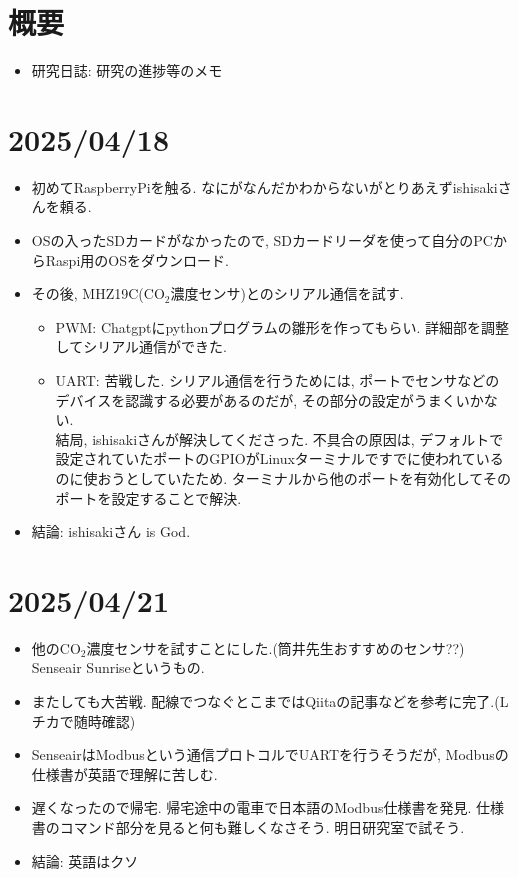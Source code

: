 \documentclass[11pt,a4paper,uplatex]{jsarticle}
\begin{document}
\section{概要}
\begin{itemize}
    \item 研究日誌: 研究の進捗等のメモ
\end{itemize}

\section{2025/04/18}
\begin{itemize}
    \item 初めてRaspberryPiを触る. なにがなんだかわからないがとりあえずishisakiさんを頼る.

    \item OSの入ったSDカードがなかったので, SDカードリーダを使って自分のPCからRaspi用のOSをダウンロード.
    \item その後, MHZ19C(CO$_2$濃度センサ)とのシリアル通信を試す. \url{}
    \begin{itemize}
        \item PWM: Chatgptにpythonプログラムの雛形を作ってもらい. 詳細部を調整してシリアル通信ができた.
        \item UART: 苦戦した. シリアル通信を行うためには, ポートでセンサなどのデバイスを認識する必要があるのだが, その部分の設定がうまくいかない. \\
        結局, ishisakiさんが解決してくださった. 不具合の原因は, デフォルトで設定されていたポートのGPIOがLinuxターミナルですでに使われているのに使おうとしていたため. 
        ターミナルから他のポートを有効化してそのポートを設定することで解決.
    \end{itemize}
    \item 結論: ishisakiさん is God.
\end{itemize}


\section{2025/04/21}
\begin{itemize}
    \item 他のCO$_2$濃度センサを試すことにした.(筒井先生おすすめのセンサ??) Senseair Sunriseというもの. \url{}
    \item またしても大苦戦. 配線でつなぐとこまではQiitaの記事などを参考に完了.(Lチカで随時確認)
    \item SenseairはModbusという通信プロトコルでUARTを行うそうだが, Modbusの仕様書が英語で理解に苦しむ.
    \item 遅くなったので帰宅. 帰宅途中の電車で日本語のModbus仕様書を発見. 仕様書のコマンド部分を見ると何も難しくなさそう. 明日研究室で試そう.
    \item 結論: 英語はクソ
\end{itemize}
\end{document}
